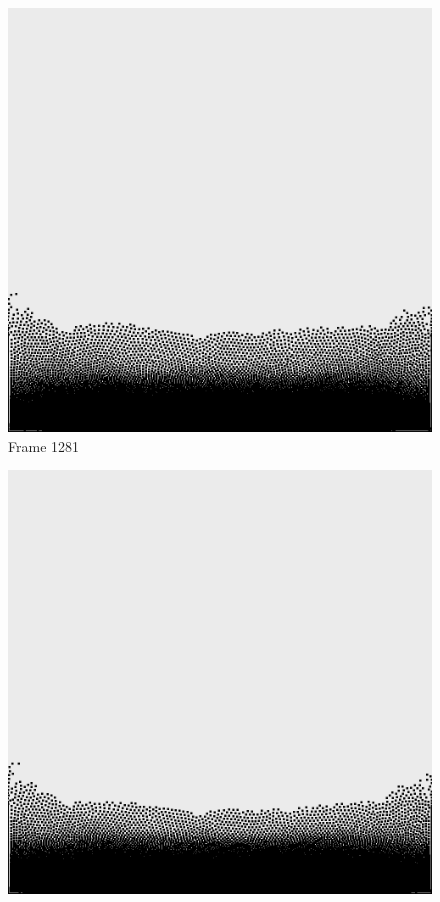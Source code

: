 \documentclass[a4paper, 12pt, oneside]{book}
\begin{document}
\begin{figure}[!ht]
    \addvspace{0.5ex}
        \begin{center}
            \includegraphics[width=\linewidth]{images/test_case_1/1281.png}
            Frame 1281
        \end{center}
    \endminipage
    \hfill
        \begin{center}
            \includegraphics[width=\linewidth]{images/test_case_1/1301.png}

\end{center}
\end{figure}
\end{document}
